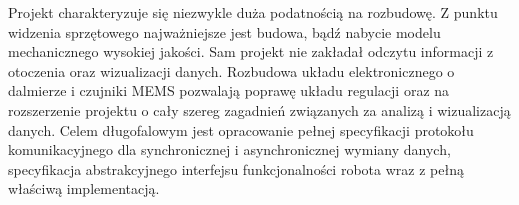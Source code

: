 \documentclass[eng,printmode]{mgr}
\begin{document}
Projekt charakteryzuje się niezwykle duża podatnością  na rozbudowę. Z punktu widzenia sprzętowego najważniejsze jest budowa, bądź nabycie modelu mechanicznego wysokiej jakości. Sam projekt nie zakładał odczytu informacji z otoczenia oraz wizualizacji danych. Rozbudowa układu elektronicznego o dalmierze i czujniki MEMS pozwalają poprawę układu regulacji oraz na rozszerzenie projektu o cały szereg zagadnień związanych za analizą i wizualizacją danych. Celem długofalowym jest opracowanie pełnej specyfikacji protokołu komunikacyjnego dla synchronicznej i asynchronicznej wymiany danych, specyfikacja abstrakcyjnego interfejsu funkcjonalności robota wraz z pełną właściwą implementacją. 


\end{document}
